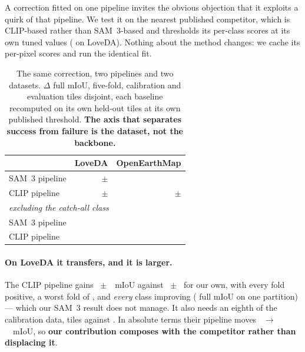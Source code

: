 \documentclass[10pt,a4paper]{article}                        %
\newcommand{\best}[1]{\textbf{#1}}
\begin{document}
A correction fitted on one pipeline invites the obvious objection that it exploits
a quirk of that pipeline. We test it on the nearest published competitor, which is
CLIP-based rather than SAM~3-based and thresholds its per-class scores at its own
tuned values (\cnTau{} on LoveDA). Nothing about the method changes: we cache its
per-pixel scores and run the identical fit.

\begin{table}[t]\centering\small
\caption{The same correction, two pipelines and two datasets. $\Delta$ full mIoU,
five-fold, calibration and evaluation tiles disjoint, each baseline recomputed on
its own held-out tiles at its own published threshold. \best{The axis that
separates success from failure is the dataset, not the backbone.}}
\label{tab:transfer}
\begin{tabular}{lrr}
\toprule
 & LoveDA & OpenEarthMap \\
\midrule
SAM~3 pipeline  & \best{\methodGain{} $\pm$ \methodSD{}} & \mrOemFull{} \\
CLIP pipeline   & \best{\cnCV{} $\pm$ \cnCVsd{}} & \cnOemCV{} $\pm$ \cnOemCVsd{} \\
\midrule
\multicolumn{3}{l}{\emph{excluding the catch-all class}}\\
SAM~3 pipeline  & \mrLoveReal{} & \mrOemReal{} \\
CLIP pipeline   & \cnReal{} & \cnOemReal{} \\
\bottomrule
\end{tabular}
\end{table}

\paragraph{On LoveDA it transfers, and it is larger.} The CLIP pipeline gains
\cnCV{}~$\pm$~\cnCVsd{}~mIoU against \methodGain{}~$\pm$~\methodSD{} for our own,
with every fold positive, a worst fold of \cnWorst{}, and \emph{every} class
improving (\cnFull{} full mIoU on one partition) --- which our SAM~3 result does
not manage. It also needs an eighth of
the calibration data, \cnCalib{} tiles against \calibTiles{}. In absolute terms
their pipeline moves \cnBase{}~$\to$~\cnFit{}~mIoU, so \best{our contribution
composes with the competitor rather than displacing it}.
\end{document}

